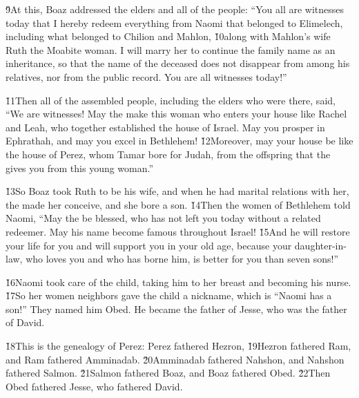 \v{9}At this, Boaz addressed the elders and all of the people: ``You all are witnesses today that I hereby redeem everything from Naomi that belonged to Elimelech, including what belonged to Chilion and Mahlon, \v{10}along with Mahlon's wife Ruth the Moabite woman. I will marry her to continue the family name as an inheritance, so that the name of the deceased does not disappear from among his relatives, nor from the public record. You are all witnesses today!''

\v{11}Then all of the assembled people, including the elders who were there, said, ``We are witnesses! May the  make this woman who enters your house like Rachel and Leah, who together established the house of Israel. May you prosper in Ephrathah, and may you excel in Bethlehem! \v{12}Moreover, may your house be like the house of Perez, whom Tamar bore for Judah, from the offspring that the  gives you from this young woman.''

\v{13}So Boaz took Ruth to be his wife, and when he had marital relations with her, the  made her conceive, and she bore a son. \v{14}Then the women of Bethlehem told Naomi, ``May the  be blessed, who has not left you today without a related redeemer. May his name become famous throughout Israel! \v{15}And he will restore your life for you and will support you in your old age, because your daughter-in-law, who loves you and who has borne him, is better for you than seven sons!''

\v{16}Naomi took care of the child, taking him to her breast and becoming his nurse. \v{17}So her women neighbors gave the child a nickname, which is ``Naomi has a son!'' They named him Obed. He became the father of Jesse, who was the father of David.

\v{18}This is the genealogy of Perez: Perez fathered Hezron, \v{19}Hezron fathered Ram, and Ram fathered Amminadab. \v{20}Amminadab fathered Nahshon, and Nahshon fathered Salmon. \v{21}Salmon fathered Boaz, and Boaz fathered Obed. \v{22}Then Obed fathered Jesse, who fathered David.
